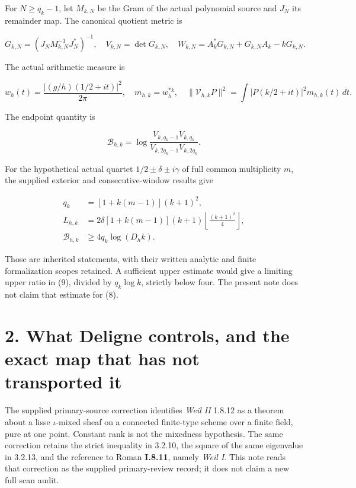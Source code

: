 \documentclass[
  11pt,
]{article}
\begin{document}
For \(N\ge q_k-1\), let \(M_{k,N}\) be the Gram of the actual polynomial
source and \(J_N\) its remainder map. The canonical quotient metric is

\[
G_{k,N}=(J_NM_{k,N}^{-1}J_N^*)^{-1},\quad
V_{k,N}=\det G_{k,N},\quad
W_{k,N}=A_k^*G_{k,N}+G_{k,N}A_k-kG_{k,N}.
\tag{7}
\]

The actual arithmetic measure is

\[
w_h(t)=\frac{|(g/h)(1/2+it)|^2}{2\pi},\quad
m_{h,k}=w_h^{*k},\quad
\|\mathcal V_{h,k}P\|^2=\int|P(k/2+it)|^2m_{h,k}(t)\,dt.
\tag{8}
\]

The endpoint quantity is

\[
\mathcal B_{h,k}=
\log\frac{V_{k,q_k-1}V_{k,q_k}}
{V_{k,2q_k-1}V_{k,2q_k}}.
\tag{9}
\]

For the hypothetical actual quartet \(1/2\pm\delta\pm i\gamma\) of full
common multiplicity \(m\), the supplied exterior and consecutive-window
results give

\[
\begin{aligned}
q_k&=[1+k(m-1)](k+1)^2,\\
L_{h,k}&=2\delta[1+k(m-1)](k+1)
\left\lfloor\frac{(k+1)^2}{4}\right\rfloor,\\
\mathcal B_{h,k}&\ge4q_k\log(D_hk).
\end{aligned}
\tag{10}
\]

Those are inherited statements, with their written analytic and finite
formalization scopes retained. A sufficient upper estimate would give a
limiting upper ratio in (9), divided by \(q_k\log k\), strictly below
four. The present note does not claim that estimate for (8).

\section{2. What Deligne controls, and the exact map that has not
transported
it}\label{what-deligne-controls-and-the-exact-map-that-has-not-transported-it}

The supplied primary-source correction identifies \emph{Weil II} 1.8.12
as a theorem about a lisse \(\iota\)-mixed sheaf on a connected
finite-type scheme over a finite field, pure at one point. Constant rank
is not the mixedness hypothesis. The same correction retains the strict
inequality in 3.2.10, the square of the same eigenvalue in 3.2.13, and
the reference to Roman \textbf{I.8.11}, namely \emph{Weil I}. This note
reads that correction as the supplied primary-review record; it does not
claim a new full scan audit.
\end{document}
